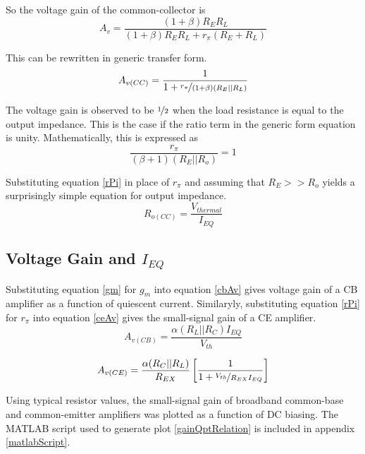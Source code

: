 \documentclass[titlepage, letterpaper, 11pt]{article}
\begin{document}
So the voltage gain of the common-collector is
\begin{equation*}
A_{v}=\frac{(1+\beta)R_{E}R_{L}}
{(1+\beta)R_{E}R_{L}+r_{\pi}(R_{E}+R_{L})}
\end{equation*}

This can be rewritten in generic transfer form.
\begin{equation}
A_{v(CC)}=\frac{1}{1+\nicefrac{r_{\pi}}{(1+\beta)(R_{E}||R_{L})}}
\label{ccAv}
\end{equation}

The voltage gain is observed to be $\nicefrac{1}{2}$ when the load
resistance is equal to the output impedance. This is the case if the
ratio term in the generic form equation is unity. Mathematically,
this is expressed as
\begin{equation*}
\frac{r_{\pi}}{(\beta+1)(R_{E}||R_{o})}=1
\end{equation*}

Substituting equation \ref{rPi} in place of $r_{\pi}$ and assuming
that $R_{E}>>R_{o}$ yields a surprisingly simple equation for output
impedance.
\begin{equation}
R_{o(CC)}=\frac{V_{thermal}}{I_{EQ}}
\label{ccRo}
\end{equation}

\subsection{Voltage Gain and $I_{EQ}$}
\label{gainVSquiescentCurrent}

Substituting equation \ref{gm} for $g_{m}$ into equation \ref{cbAv}
gives voltage gain of a CB amplifier as a function of quiescent
current. Similaryly, substituting equation \ref{rPi} for $r_{\pi}$
into equation \ref{ceAv} gives the small-signal gain of a CE
amplifier.
\begin{equation}
A_{v(CB)}=\frac{\alpha(R_{L}||R_{C})I_{EQ}}{V_{th}}
\end{equation}

\begin{equation}
A_{v(CE)}=\frac{\alpha(R_{C}||R_{L})}{R_{EX}}
\left[\frac{1}{1+\nicefrac{V_{th}}{R_{EX}I_{EQ}}}\right]
\end{equation}

Using typical resistor values, the small-signal gain of broadband
common-base and common-emitter amplifiers was plotted as a function
of DC biasing. The MATLAB script used to generate plot
\ref{gainQptRelation} is included in appendix \ref{matlabScript}.
\end{document}
